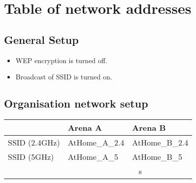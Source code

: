\chapter{Table of network addresses}

\section{General Setup}
\begin{itemize}
 \item WEP encryption is turned off.
 \item Broadcast of SSID is turned on.
\end{itemize}

\section{Organisation network setup}
\begin{table}
    \begin{tabular}{|l|l|l|}
\hline
    ~              & Arena A        & Arena B        \\ \hline
    SSID (2.4GHz)  & AtHome\_A\_2.4 & AtHome\_B\_2.4 \\ \hline
    SSID (5GHz)    & AtHome\_A\_5   & AtHome\_B\_5   \\ \hline
    ~              & ~              & ~          s    \\ \hline
    \end{tabular}
\end{table}

